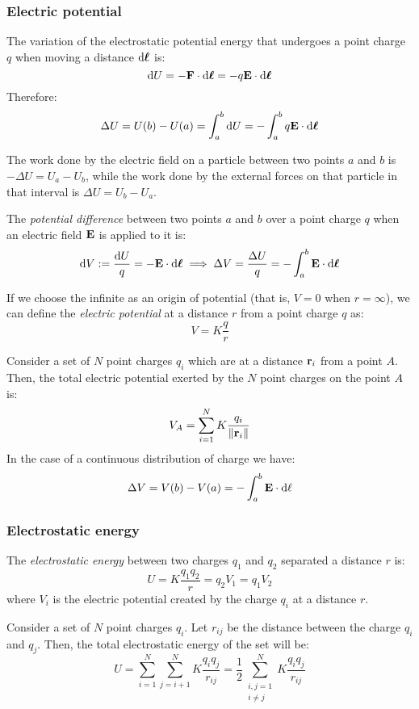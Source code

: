 \documentclass[../../../main.tex]{subfiles}
\begin{document}
\begin{multicols}{2}
  \subsubsection{Electric potential}
  \begin{prop}
    The variation of the electrostatic potential energy that undergoes a point charge $q$ when moving a distance $\dd\boldsymbol{\mathrm{\ell}}$ is:
    $$\dd U=-\boldsymbol{\mathrm{F}}\cdot \dd\boldsymbol{\mathrm{\ell}}=-q\boldsymbol{\mathrm{E}}\cdot \dd\boldsymbol{\mathrm{\ell}}$$
    Therefore:
    $$\Delta U=U(b)-U(a)=\int_a^b\dd U=-\int_a^bq\boldsymbol{\mathrm{E}}\cdot \dd \boldsymbol{\mathrm{\ell}}$$
  \end{prop}
  \begin{prop}
    The work done by the electric field on a particle between two points $a$ and $b$ is $-\Delta U=U_a-U_b$, while the work done by the external forces on that particle in that interval is $\Delta U=U_b-U_a$.
  \end{prop}
  \begin{definition}
    The \textit{potential difference} between two points $a$ and $b$ over a point charge $q$ when an electric field $\boldsymbol{\mathrm{E}}$ is applied to it is:
    $$\dd V:=\frac{\dd U}{q}=-\boldsymbol{\mathrm{E}}\cdot\dd \boldsymbol{\mathrm{\ell}}\implies\Delta V=\frac{\Delta U}{q}=-\int_a^b\boldsymbol{\mathrm{E}}\cdot\dd \boldsymbol{\mathrm{\ell}}$$
  \end{definition}
  \begin{definition}
    If we choose the infinite as an origin of potential (that is, $V=0$ when $r=\infty$), we can define the \textit{electric potential} at a distance $r$ from a point charge $q$ as: $$V=K\frac{q}{r}$$
  \end{definition}
  \begin{principle}
    Consider a set of $N$ point charges $q_i$ which are at a distance $\boldsymbol{\mathrm{r}}_i$ from a point $A$. Then, the total electric potential exerted by the $N$ point charges on the point $A$ is:
    $$V_A=\sum_{i=1}^NK\frac{q_i}{\|\boldsymbol{\mathrm{r}}_{i}\|}$$
    In the case of a continuous distribution of charge we have:
    $$\Delta V=V(b)-V(a)=-\int_a^b\boldsymbol{\mathrm{E}}\cdot\dd\ell$$
  \end{principle}
  \subsubsection{Electrostatic energy}
  \begin{definition}
    The \textit{electrostatic energy} between two charges $q_1$ and $q_2$ separated a distance $r$ is: $$U=K\frac{q_1q_2}{r}=q_2V_1=q_1V_2$$
    where $V_i$ is the electric potential created by the charge $q_i$ at a distance $r$.
  \end{definition}
  \begin{prop}
    Consider a set of $N$ point charges $q_i$. Let $r_{ij}$ be the distance between the charge $q_i$ and $q_j$. Then, the total electrostatic energy of the set will be: $$U=\sum_{i=1}^N\sum_{j=i+1}^NK\frac{q_iq_j}{r_{ij}}=\frac{1}{2}\sum_{\substack{i,j=1\\i\ne j}}^NK\frac{q_iq_j}{r_{ij}}$$
  \end{prop}

\end{multicols}
\end{document}
